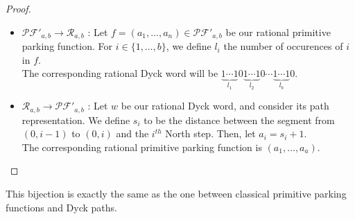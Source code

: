 \begin{proof}
    ~\
\begin{itemize}
    \item $\mathcal{PF'}_{a,b} \to \mathcal{R}_{a,b}$ :
    Let $f = (a_1, \ldots, a_n) \in \mathcal{PF'}_{a,b}$
    be our rational primitive parking function.
    For $i \in \{1, \ldots, b\}$, we define $l_i$ the
    number of occurences of $i$ in $f$.\\
    The corresponding rational Dyck word will be
    $\underbrace{1 \cdots 1}_{l_1}0
     \underbrace{1 \cdots 1}_{l_2}0 \cdots
     \underbrace{1 \cdots 1}_{l_b}0$.
    
    \item $\mathcal{R}_{a,b} \to \mathcal{PF'}_{a,b}$ :
    Let $w$ be our rational Dyck word, and consider its path
    representation. We define $s_i$ to be the distance
    between the segment from $(0, i - 1)$ to $(0, i)$
    and the $i^{th}$ North step. Then, let $a_i = s_i + 1$.\\
    The corresponding rational primitive parking function is 
    $(a_1, \ldots, a_a)$.
\end{itemize}
\end{proof}

\begin{rem}
    This bijection is exactly the same as the one between
    classical primitive parking functions and Dyck paths.
\end{rem}

